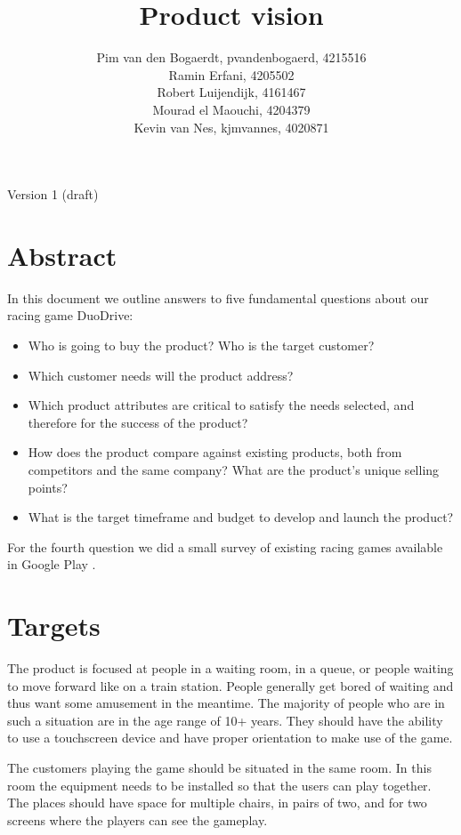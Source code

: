 \documentclass[11pt,twoside,a4paper]{article}
\title{Product vision}
\author{
	Pim van den Bogaerdt, pvandenbogaerd, 4215516\\
	Ramin Erfani, 4205502\\
	Robert Luijendijk, 4161467\\
	Mourad el Maouchi, 4204379\\
	Kevin van Nes, kjmvannes, 4020871
}
\begin{document}
\maketitle
\begin{center}
Version 1 (draft)
\end{center}
\clearpage

\section*{Abstract}
In this document we outline answers to five fundamental questions \cite{pichler} about our racing game DuoDrive:

\begin{itemize}
\item Who is going to buy the product? Who is the target customer? 
\item Which customer needs will the product address? 
\item Which product attributes are critical to satisfy the needs selected, and therefore for the success of the product? 
\item How does the product compare against existing products, both from competitors and the same company? What are the product’s unique selling points? 
\item What is the target timeframe and budget to develop and launch the product?
\end{itemize}

For the fourth question we did a small survey of existing racing games available in Google Play \cite{googleplay}.

\clearpage
\tableofcontents

\clearpage

\section{Targets}
The product is focused at people in a waiting room, in a queue, or people waiting to move forward like on a train station. People generally get bored of waiting and thus want some amusement in the meantime. The majority of people who are in such a situation are in the age range of 10+ years. They should have the ability to use a touchscreen device and have proper orientation to make use of the game.

The customers playing the game should be situated in the same room. In this room the equipment needs to be installed so that the users can play together. The places should have space for multiple chairs, in pairs of two, and for two screens where the players can see the gameplay.
\end{document}
